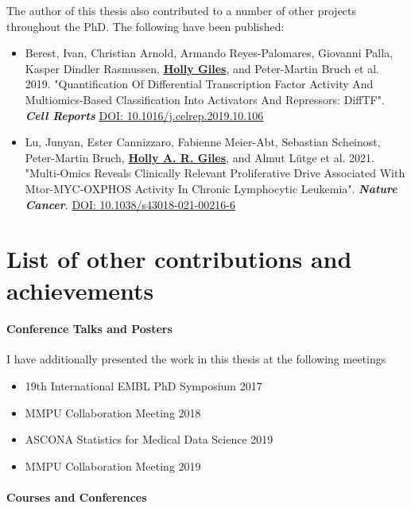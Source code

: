 \documentclass[11pt, a4paper, twosided]{book}
\begin{document}
    The author of this thesis also contributed to a number of other projects throughout the PhD. The following have been published:
    \begin{itemize}
        \item Berest, Ivan\ast, Christian Arnold\ast, Armando Reyes-Palomares, Giovanni Palla, Kasper Dindler Rasmussen, \textbf{\underline{Holly Giles}}, and Peter-Martin Bruch et al. 2019. "Quantification Of Differential Transcription Factor Activity And Multiomics-Based Classification Into Activators And Repressors: DiffTF". \textbf{\textit{Cell Reports}} \href{https://doi.org/10.1016/j.celrep.2019.10.106}{DOI: 10.1016/j.celrep.2019.10.106}
        
      \item Lu, Junyan\ast, Ester Cannizzaro\ast, Fabienne Meier-Abt, Sebastian Scheinost, Peter-Martin Bruch, \textbf{\underline{Holly A. R. Giles}}, and Almut Lütge et al. 2021. "Multi-Omics Reveals Clinically Relevant Proliferative Drive Associated With Mtor-MYC-OXPHOS Activity In Chronic Lymphocytic Leukemia". \textbf{\textit{Nature Cancer}}. \href{https://doi.org/10.1038/s43018-021-00216-6}{DOI: 10.1038/s43018-021-00216-6}
    \end{itemize}
\newpage\null\newpage

    \hypertarget{list-of-other-contributions-and-achievements}{%
    \chapter*{List of other contributions and achievements}\label{list-of-other-contributions-and-achievements}}

    \hypertarget{conference-talks-and-posters}{%
    \subsubsection*{Conference Talks and Posters}\label{conference-talks-and-posters}}

    I have additionally presented the work in this thesis at the following meetings\\
    \begin{itemize}
      \item  19th International EMBL PhD Symposium 2017
      \item  MMPU Collaboration Meeting 2018
      \item  ASCONA Statistics for Medical Data Science 2019
      \item  MMPU Collaboration Meeting 2019
    \end{itemize}
    \hypertarget{courses-and-conferences}{%
    \subsubsection*{Courses and Conferences}\label{courses-and-conferences}}
\end{document}
